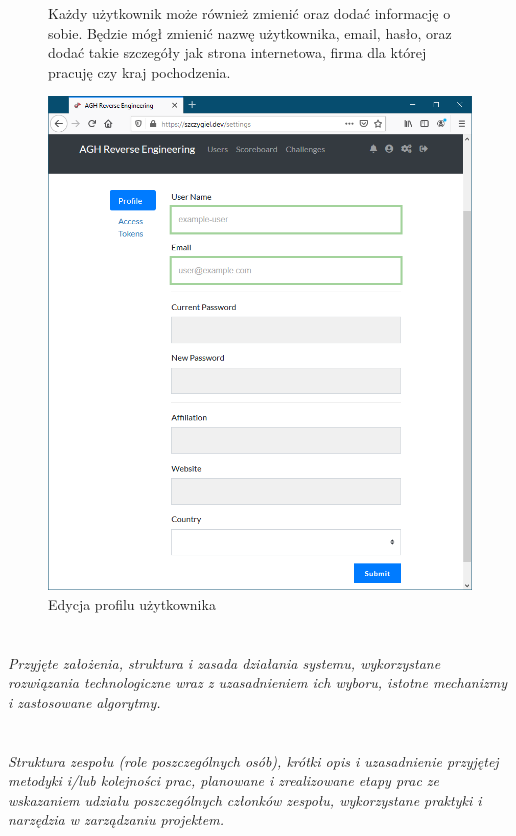 \documentclass[polish,12pt]{aghthesis}
\begin{document}
\begin{figure}[ht]
    Każdy użytkownik może również zmienić oraz dodać informację o sobie.
    Będzie mógł zmienić nazwę użytkownika, email, hasło, oraz dodać
    takie szczegóły jak strona internetowa, firma dla której pracuję czy kraj pochodzenia.

    \vspace{1cm}

    \centering
    \includegraphics[width=14cm]{szczygiel_dev_settings}
    \caption{Edycja profilu użytkownika}
    \label{fig:szczygiel_dev_settings}
\end{figure}

\clearpage

\section{\SectionTitleRealizationAspects}
\label{sec:wybrane-aspekty-realizacji}
\emph{Przyjęte założenia, struktura i zasada działania systemu,
  wykorzystane rozwiązania technologiczne wraz z uzasadnieniem
  ich wyboru, istotne mechanizmy i zastosowane algorytmy.}

\section{\SectionTitleWorkOrganization}
\label{sec:organizacja-pracy}
\emph{Struktura zespołu (role poszczególnych osób), krótki opis i
  uzasadnienie przyjętej metodyki i/lub kolejności prac, planowane i
  zrealizowane etapy prac ze wskazaniem udziału poszczególnych
  członków zespołu, wykorzystane praktyki i narzędzia w zarządzaniu
  projektem.}
\end{document}
